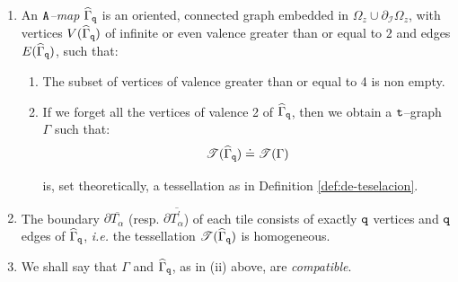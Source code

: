 \documentclass[10pt,a4paper]{amsart}
\begin{document}
\begin{definition}
\label{definicion-de-A-map}
\begin{enumerate}[label=\arabic*),leftmargin=*] 
\item
An {\it ${\tt A}$--map} $\widehat{\Gamma}_{\tt q}$ is an 
oriented, connected graph 
embedded in  $\Omega_z \cup \partial_{\mathcal{I}} \Omega_z$, 
with vertices $V(\widehat{\Gamma}_{\tt q})$ of
infinite or 
even valence  greater than or equal to $2$
and edges $E (\widehat{\Gamma}_{\tt q})$, such that:

\begin{enumerate}[label=\roman*),leftmargin=*]
\item
The subset of vertices of valence greater
than or equal to 4 is non empty. 

\item
If we forget all the vertices
of valence 2 of $\widehat{\Gamma}_{\tt q}$, then
we obtain a ${\tt t}$--graph $\Gamma$ such that:
%
\begin{equation}
\label{eq:tessellation}
%
\mathscr{T}(\widehat{\Gamma}_{\tt q}) \doteq %
\mathscr{T}(\Gamma)
\end{equation}



\noindent
is, set theoretically, a tessellation as in Definition 
\ref{def:de-teselacion}.
\end{enumerate}

\item 
The boundary 
$\partial \overline{T_\alpha}$ 
(resp. $\partial \overline{T_{\alpha}^\prime}$) of  
each tile consists of exactly $\tt q$ vertices and $\tt q$ edges 
of $\widehat{\Gamma}_{\tt q}$,
{\it i.e.} the tessellation $\mathscr{T}(\widehat{\Gamma}_{\tt q})$ is homogeneous.

\item 
We shall say that $\Gamma$ and $\widehat{\Gamma}_{\tt q}$, as in (ii) above, are \emph{compatible}.
\end{enumerate}
\end{definition}
\end{document}
